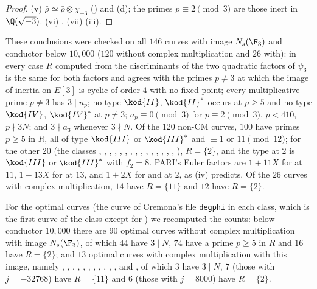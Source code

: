 \begin{proof}
(v) $\bar\rho\simeq\bar\rho\otimes\chi_{-3}$ () and (d); the primes $p\equiv2\pmod3$ are those inert in $\Q(\sqrt{-3})$.
(vi) . (vii) (iii).
\end{proof}

These conclusions were checked on all $146$ curves with image $N_s(\F_3)$ and conductor below $10{,}000$ ($120$ without complex multiplication and $26$ with):
in every case $R$ computed from the discriminants of the two quadratic factors of $\psi_3$ is the same for both factors and agrees with the
primes $p\ne3$ at which the image of inertia on $E[3]$ is cyclic of order $4$ with no fixed point; every multiplicative prime $p\ne3$ has $3\mid n_p$; no
type $\kod{II}$, $\kod{II}^*$ occurs at $p\ge5$ and no type $\kod{IV}$, $\kod{IV}^*$ at $p\ne3$; $a_p\equiv0\pmod3$ for $p\equiv2\pmod3$, $p<410$, $p\nmid3N$; and $3\nmid a_3$ whenever
$3\nmid N$. Of the $120$ non-CM curves, $100$ have primes $p\ge5$ in $R$, all of type $\kod{III}$ or $\kod{III}^*$ and $\equiv1$ or $11\pmod{12}$; for the other $20$ (the
classes , , , , , , , , , , ,
, , , , ), $R=\{2\}$, and the type at $2$ is $\kod{III}$ or $\kod{III}^*$ with $f_2=8$. PARI's Euler factors are
$1+11X$ for  at $11$, $1-13X$ for  at $13$, and $1+2X$ for  and  at $2$, as (iv) predicts. Of the $26$
curves with complex multiplication, $14$ have $R=\{11\}$ and $12$ have $R=\{2\}$.

For the optimal curves (the curve of Cremona's file \texttt{degphi} in each class, which is the first curve of the class except for ) we
recomputed the counts: below conductor $10{,}000$ there are $90$ optimal curves without complex multiplication with image $N_s(\F_3)$, of which $44$ have
$3\mid N$, $74$ have a prime $p\ge5$ in $R$ and $16$ have $R=\{2\}$; and $13$ optimal curves with complex multiplication with this image, namely ,
, , , , , , , , , ,
 and , of which $3$ have $3\mid N$, $7$ (those with $j=-32768$) have $R=\{11\}$ and $6$ (those with $j=8000$) have $R=\{2\}$.

